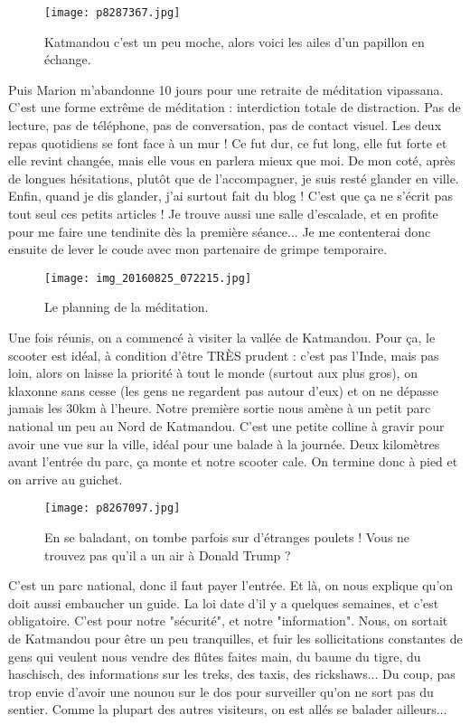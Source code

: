 \documentclass{book}
\begin{document}
\begin{figure}[h]
\centering
\texttt{[image: p8287367.jpg]}
\caption*{Katmandou c'est un peu moche, alors voici les ailes d'un papillon en échange.}
\end{figure}

Puis Marion m'abandonne 10 jours pour une retraite de méditation vipassana. C'est une forme extrême de méditation : interdiction totale de distraction. Pas de lecture, pas de téléphone, pas de conversation, pas de contact visuel. Les deux repas quotidiens se font face à un mur ! Ce fut dur, ce fut long, elle fut forte et elle revint changée, mais elle vous en parlera mieux que moi. De mon coté, après de longues hésitations, plutôt que de l'accompagner, je suis resté glander en ville. Enfin, quand je dis glander, j'ai surtout fait du blog ! C'est que ça ne s'écrit pas tout seul ces petits articles ! Je trouve aussi une salle d'escalade, et en profite pour me faire une tendinite dès la première séance... Je me contenterai donc ensuite de lever le coude avec mon partenaire de grimpe temporaire.


\begin{figure}[h]
\centering
\texttt{[image: img\_20160825\_072215.jpg]}
\caption*{Le planning de la méditation.}
\end{figure}

Une fois réunis, on a commencé à visiter la vallée de Katmandou. Pour ça, le scooter est idéal, à condition d'être TRÈS prudent : c'est pas l'Inde, mais pas loin, alors on laisse la priorité à tout le monde (surtout aux plus gros), on klaxonne sans cesse (les gens ne regardent pas autour d'eux) et on ne dépasse jamais les 30km à l'heure. Notre première sortie nous amène à un petit parc national un peu au Nord de Katmandou. C'est une petite colline à gravir pour avoir une vue sur la ville, idéal pour une balade à la journée. Deux kilomètres avant l'entrée du parc, ça monte et notre scooter cale. On termine donc à pied et on arrive au guichet.


\begin{figure}[h]
\centering
\texttt{[image: p8267097.jpg]}
\caption*{En se baladant, on tombe parfois sur d'étranges poulets ! Vous ne trouvez pas qu'il a un air à Donald Trump ?}
\end{figure}

C'est un parc national, donc il faut payer l'entrée. Et là, on nous explique qu'on doit aussi embaucher un guide. La loi date d'il y a quelques semaines, et c'est obligatoire. C'est pour notre "sécurité", et notre "information". Nous, on sortait de Katmandou pour être un peu tranquilles, et fuir les sollicitations constantes de gens qui veulent nous vendre des flûtes faites main, du baume du tigre, du haschisch, des informations sur les treks, des taxis, des rickshaws... Du coup, pas trop envie d'avoir une nounou sur le dos pour surveiller qu'on ne sort pas du sentier. Comme la plupart des autres visiteurs, on est allés se balader ailleurs...
\end{document}
